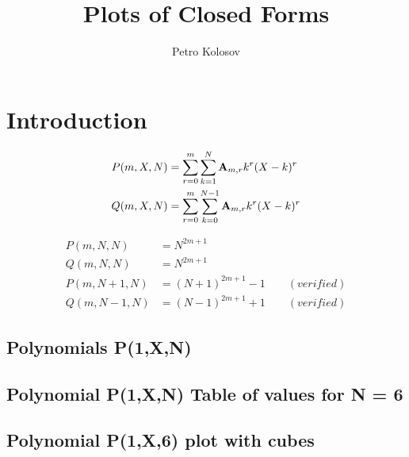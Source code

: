 \documentclass[12pt,letterpaper,oneside,reqno]{amsart}
\title[Plots of Closed Forms]
{Plots of Closed Forms}
\author[Petro Kolosov]{Petro Kolosov}
\newcommand \coeffA [3][A] {{\mathbf{#1}} \sb{#2,#3}}
\newcommand \polynomialP [4][P]{{#1}(#2,#3,#4)}
\newcommand \polynomialQ [4][Q]{{#1}(#2,#3,#4)}
\begin{document}
%        

    \maketitle

    \tableofcontents


    \section{Introduction}\label{sec:introduction}
    \begin{align*}
        \polynomialP{m}{X}{N} &= \sum_{r=0}^{m} \sum_{k=1}^{N} \coeffA{m}{r} k^r (X-k)^r \\
        \polynomialQ{m}{X}{N} &= \sum_{r=0}^{m} \sum_{k=0}^{N-1} \coeffA{m}{r} k^r (X-k)^r
    \end{align*}

    \begin{align*}
        \polynomialP{m}{N}{N} &= N^{2m+1} \\
        \polynomialQ{m}{N}{N} &= N^{2m+1} \\
        \polynomialP{m}{N+1}{N} &= (N+1)^{2m+1} - 1 \quad \quad (verified) \\
        \polynomialQ{m}{N-1}{N} &= (N-1)^{2m+1} + 1 \quad \quad (verified)
    \end{align*}

    \subsection{Polynomials P(1,X,N)}
    

    \subsection{Polynomial P(1,X,N) Table of values for N = 6}
    

    \subsection{Polynomial P(1,X,6) plot with cubes}
    
\end{document}
